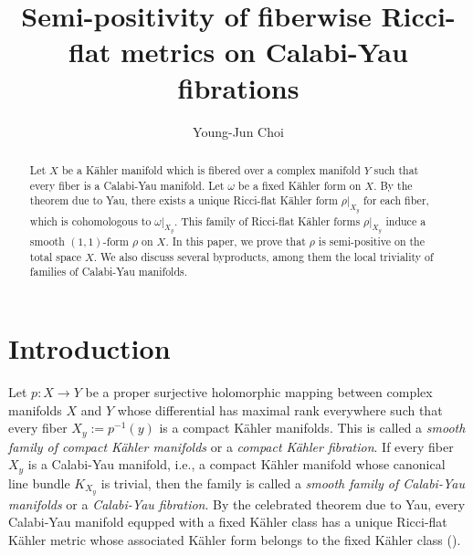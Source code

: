\documentclass{amsart}
\theoremstyle{definition}
\numberwithin{equation}{section}
\begin{document}
\title[Fiberwise Ricci-flat metrics]{Semi-positivity of fiberwise Ricci-flat metrics on Calabi-Yau fibrations}

\author{Young-Jun Choi}

\address{School of Mathematics, Korea Institute for Advanced Study(KIAS), 85 Hoegiro Dongdaemun-gu, Seoul 130-722 790-784, Republic of Korea}




\maketitle

\begin{abstract}
Let $X$ be a K\"ahler manifold which is fibered over a complex manifold $Y$ such that every fiber is a Calabi-Yau manifold. Let $\omega$ be a fixed K\"ahler form on $X$. By the theorem due to Yau, there exists a unique Ricci-flat K\"ahler form $\rho\vert_{X_y}$ for each fiber, which is cohomologous to $\omega\vert_{X_y}$. This family of Ricci-flat K\"ahler forms $\rho\vert_{X_y}$ induce a smooth $(1,1)$-form $\rho$ on $X$. In this paper, we prove that $\rho$ is semi-positive on the total space $X$. We also discuss several byproducts, among them the local triviality of families of Calabi-Yau manifolds.
\end{abstract}

\section{Introduction}

Let $p:X\rightarrow Y$ be a proper surjective holomorphic mapping between complex manifolds $X$ and $Y$ whose differential has maximal rank everywhere such that every fiber $X_y:=p^{-1}(y)$ is a compact K\"ahler manifolds. This is called a \emph{smooth family of compact K\"ahler manifolds} or a \emph{compact K\"ahler fibration}. If every fiber $X_y$ is a Calabi-Yau manifold, i.e., a compact K\"ahler manifold whose canonical line bundle $K_{X_y}$ is trivial, then the family is called a \emph{smooth family of Calabi-Yau manifolds} or a \emph{Calabi-Yau fibration}. By the celebrated theorem due to Yau, every Calabi-Yau manifold equpped with a fixed K\"ahler class has a unique Ricci-flat K\"ahler metric whose associated K\"ahler form belongs to the fixed K\"ahler class (\cite{Yau}).
\medskip
\end{document}
